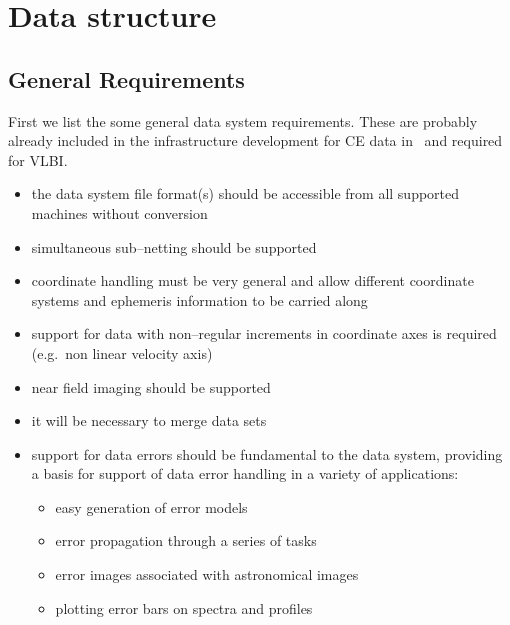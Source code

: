 \section{Data structure}

\subsection{General Requirements}

First we list the some general data system requirements. These are
probably already included in the infrastructure development for CE data in
\aipspp\ and required for VLBI.

\begin{itemize}
  
\item the data system file format(s) should be accessible from all
  supported machines without conversion
  
\item simultaneous sub--netting should be supported
  
\item coordinate handling must be very general and allow different
  coordinate systems and ephemeris information to be carried along
  
\item support for data with non--regular increments in coordinate axes
  is required (e.g.\ non linear velocity axis)
    
\item near field imaging should be supported

\item it will be necessary to merge data sets
  
\item support for data errors should be fundamental to the data
  system, providing a basis for support of data error handling in a
  variety of applications:

  \begin{itemize}

  \item easy generation of error models

  \item error propagation through a series of tasks

  \item error images associated with astronomical images
    
  \item plotting error bars on spectra and profiles


\end{itemize}
\end{itemize}
